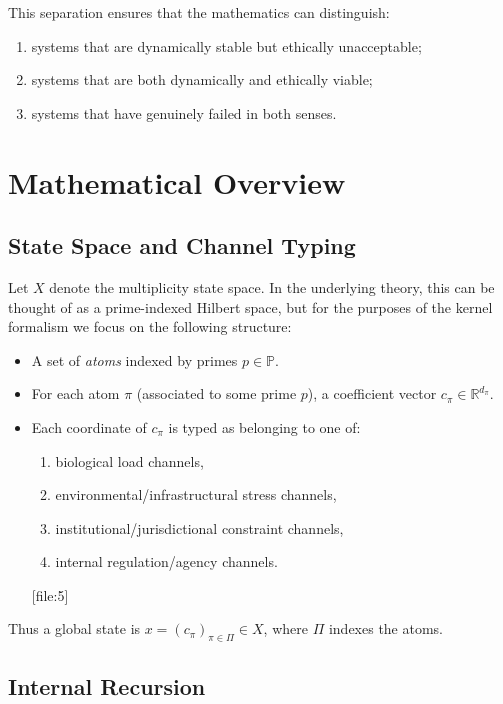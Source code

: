 \documentclass[11pt]{article}
\begin{document}
This separation ensures that the mathematics can distinguish:
\begin{enumerate}[label=(\roman*), leftmargin=*]
  \item systems that are dynamically stable but ethically unacceptable;
  \item systems that are both dynamically and ethically viable;
  \item systems that have genuinely failed in both senses.
\end{enumerate}

\section{Mathematical Overview}

\subsection{State Space and Channel Typing}

Let \(X\) denote the multiplicity state space. In the underlying theory, this can be thought of as a prime-indexed Hilbert space, but for the purposes of the kernel formalism we focus on the following structure:

\begin{itemize}[leftmargin=*]
  \item A set of \emph{atoms} indexed by primes \(p\in \mathbb{P}\).
  \item For each atom \(\pi\) (associated to some prime \(p\)), a coefficient vector \(c_\pi\in \mathbb{R}^{d_\pi}\).
  \item Each coordinate of \(c_\pi\) is typed as belonging to one of:
  \begin{enumerate}[label=(\alph*), leftmargin=*]
    \item biological load channels,
    \item environmental/infrastructural stress channels,
    \item institutional/jurisdictional constraint channels,
    \item internal regulation/agency channels.
  \end{enumerate}
  [file:5]
\end{itemize}

Thus a global state is \(x = (c_\pi)_{\pi\in \Pi}\in X\), where \(\Pi\) indexes the atoms.

\subsection{Internal Recursion}
\end{document}
